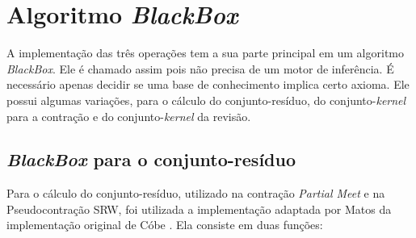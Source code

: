 \section{Algoritmo \textit{BlackBox}}

A implementação das três operações tem a sua parte principal em um algoritmo \textit{BlackBox}. Ele é chamado assim pois não precisa de um motor de inferência. É necessário apenas decidir se uma base de conhecimento implica certo axioma. Ele possui algumas variações, para o cálculo do conjunto-resíduo, do conjunto-\textit{kernel} para a contração e do conjunto-\textit{kernel} da revisão.

\subsection{\textit{BlackBox} para o conjunto-resíduo}

Para o cálculo do conjunto-resíduo, utilizado na contração \textit{Partial Meet} e na Pseudocontração SRW, foi utilizada a implementação adaptada por Matos da implementação original de Cóbe \cite{logicaMatos}. Ela consiste em duas funções:

